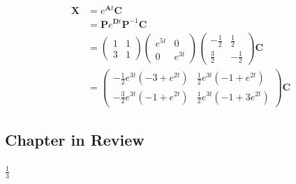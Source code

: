 \documentclass{article}
\begin{document}
\setcounter{subsubsection}{24}
\subsubsection{}

\begin{align*}
  \mathbf{X} & = e^{\mathbf{A} t} \mathbf{C}                                                \\
             & = \mathbf{P} e^{\mathbf{D} t} \mathbf{P}^{-1} \mathbf{C}                     \\
             & = \begin{pmatrix}
                   1 & 1 \\
                   3 & 1
                 \end{pmatrix} \begin{pmatrix}
                                 e^{5 t} & 0       \\
                                 0       & e^{3 t}
                               \end{pmatrix} \begin{pmatrix}
                                               -\frac{1}{2} & \frac{1}{2}  \\
                                               \frac{3}{2}  & -\frac{1}{2}
                                             \end{pmatrix} \mathbf{C}                    \\
             & = \begin{pmatrix}
                   -\frac{1}{2} e^{3 t} (-3 + e^{2 t}) & \frac{1}{2} e^{3 t} (-1 + e^{2 t})   \\
                   -\frac{3}{2} e^{3 t} (-1 + e^{2 t}) & \frac{1}{2} e^{3 t} (-1 + 3 e^{2 t})
                 \end{pmatrix} \mathbf{C}
\end{align*}

\subsection{Chapter in Review}

\subsubsection{}

$\frac{1}{3}$

\setcounter{subsubsection}{4}
\subsubsection{}
\end{document}
